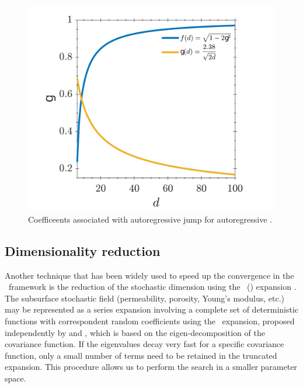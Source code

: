 \begin{figure}[H]
 \centering
 \includegraphics[scale=0.5]{./figuras/Jumps_DE.png}
 \caption{Coefficeents associated with autoregressive jump for autoregressive \DE.}
 \label{ArJumpDE}
\end{figure}

\subsection{Dimensionality reduction}

Another technique that has been widely used to speed up the convergence in the \mcmc\ framework is the reduction of the stochastic dimension using the \KL\ (\kl) expansion
\citep{efendiev05,efendiev2006,das10,mondal10,ginting11,ginting12}.
The subsurface stochastic field (permeability, porosity, Young's modulus, etc.) may be represented as a series expansion
involving a complete set of deterministic functions with correspondent random coefficients using the \kl\ expansion, proposed independently by \cite{karhunen46} and \cite{loeve55}, which is based on the eigen-decomposition of the covariance function.
If the eigenvalues decay very fast for a specific covariance function, only a small number of terms need to be retained in the truncated expansion.
This procedure allows us to perform the search in a smaller parameter space.

